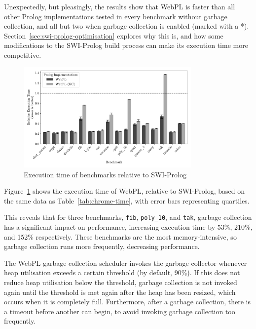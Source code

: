 \vspace*{-1.5em}

Unexpectedly, but pleasingly, the results show that WebPL is faster than all other Prolog implementations tested in every benchmark without garbage collection, and all but two when garbage collection is enabled (marked with a *). Section~\ref{sec:swi-prolog-optimisation} explores why this is, and how some modifications to the SWI-Prolog build process can make its execution time more competitive.

\begin{figure}[H]
\centering
\includegraphics[width=0.8\textwidth]{relative_performance.pdf}
\caption{Execution time of benchmarks relative to SWI-Prolog}
\label{fig:relative-performance}
\end{figure}

Figure~\ref{fig:relative-performance} shows the execution time of WebPL, relative to SWI-Prolog, based on the same data as Table~\ref{tab:chrome-time}, with error bars representing quartiles.

This reveals that for three benchmarks, \texttt{fib}, \texttt{poly\_10}, and \texttt{tak}, garbage collection has a significant impact on performance, increasing execution time by 53\%, 210\%, and 152\% respectively. These benchmarks are the most memory-intensive, so garbage collection runs more frequently, decreasing performance.

The WebPL garbage collection scheduler invokes the garbage collector whenever heap utilisation exceeds a certain threshold (by default, 90\%). If this does not reduce heap utilisation below the threshold, garbage collection is not invoked again until the threshold is met again after the heap has been resized, which occurs when it is completely full. Furthermore, after a garbage collection, there is a timeout before another can begin, to avoid invoking garbage collection too frequently.

